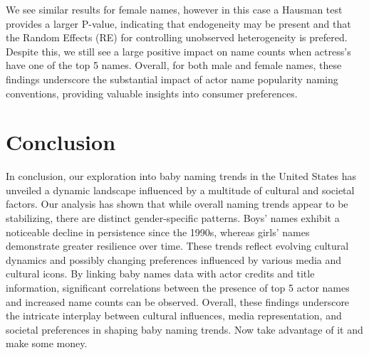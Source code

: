 \documentclass[11pt,preprint, authoryear]{elsarticle}
\numberwithin{equation}{section}
\numberwithin{figure}{section}
\numberwithin{table}{section}
\begin{document}
We see similar results for female names, however in this case a Hausman
test provides a larger P-value, indicating that endogeneity may be
present and that the Random Effects (RE) for controlling unobserved
heterogeneity is prefered. Despite this, we still see a large positive
impact on name counts when actress's have one of the top 5 names.
Overall, for both male and female names, these findings underscore the
substantial impact of actor name popularity naming conventions,
providing valuable insights into consumer preferences.

\section{Conclusion}\label{conclusion}

In conclusion, our exploration into baby naming trends in the United
States has unveiled a dynamic landscape influenced by a multitude of
cultural and societal factors. Our analysis has shown that while overall
naming trends appear to be stabilizing, there are distinct
gender-specific patterns. Boys' names exhibit a noticeable decline in
persistence since the 1990s, whereas girls' names demonstrate greater
resilience over time. These trends reflect evolving cultural dynamics
and possibly changing preferences influenced by various media and
cultural icons. By linking baby names data with actor credits and title
information, significant correlations between the presence of top 5
actor names and increased name counts can be observed. Overall, these
findings underscore the intricate interplay between cultural influences,
media representation, and societal preferences in shaping baby naming
trends. Now take advantage of it and make some money.


\end{document}
